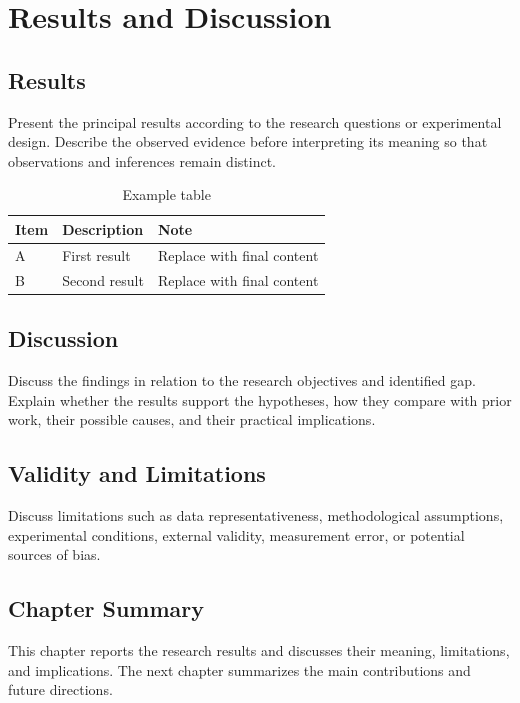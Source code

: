 \chapter{Results and Discussion}

\section{Results}

Present the principal results according to the research questions or experimental design. Describe the observed evidence before interpreting its meaning so that observations and inferences remain distinct.

\begin{table}[htbp]
  \centering
  \caption{Example table}
  \label{tab:example}
  \begin{tabular}{lll}
    \toprule
    Item & Description & Note \\
    \midrule
    A & First result & Replace with final content \\
    B & Second result & Replace with final content \\
    \bottomrule
  \end{tabular}
\end{table}

\section{Discussion}

Discuss the findings in relation to the research objectives and identified gap. Explain whether the results support the hypotheses, how they compare with prior work, their possible causes, and their practical implications.

\section{Validity and Limitations}

Discuss limitations such as data representativeness, methodological assumptions, experimental conditions, external validity, measurement error, or potential sources of bias.

\section{Chapter Summary}

This chapter reports the research results and discusses their meaning, limitations, and implications. The next chapter summarizes the main contributions and future directions.
